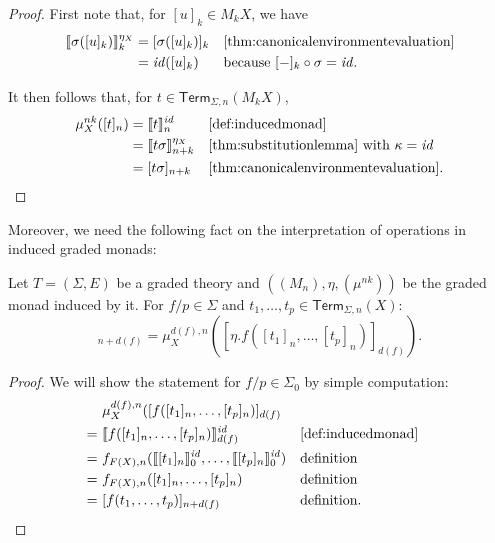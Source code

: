 \documentclass[a4paper,UKenglish,cleveref,thm-restate,numberwithinsect,final]{lipics-v2021}
\newcommand{\Term}{\mathsf{Term}}
\newcommand{\sig}{\Sigma}
\newcommand{\sigp}{\Sigma_0}
\theoremstyle{plain}
\newcommand{\id}{\mathit{id}}
\numberwithin{equation}{section}
\newcommand{\+}[1]{\mathcal{#1}\xspace}
\theoremstyle{definition}
\begin{document}
\begin{proof}
    First note that, for \([u]_k \in M_k X\), we have
    \begin{align*}
        \llbracket \sigma([u]_k) \rrbracket^{\eta_X}_{k}
        &= [\sigma([u]_k)]_k && \text{\cref{thm:canonicalenvironmentevaluation}} \\
        &= \id([u]_k) && \text{because } [-]_k \circ \sigma = \id.
    \end{align*}

    It then follows that, for \(t \in \Term_{\sig, n}(M_k X)\),
    \begin{align*}
        \mu^{nk}_X([t]_n)
        &= \llbracket t \rrbracket^{\id}_n && \text{\cref{def:inducedmonad}} \\
        &= \llbracket t\sigma \rrbracket^{\eta_X}_{n + k} && \text{\cref{thm:substitutionlemma} with } \kappa = \id \\
        &= [t\sigma]_{n + k} && \text{\cref{thm:canonicalenvironmentevaluation}}.
    \end{align*}

\end{proof}

Moreover, we need the following fact on the interpretation of operations in
induced graded monads:

\begin{lemma}\label{thm:multiplicationwithzero}
    Let \(T = (\sig, E)\) be a graded theory and \(((M_n), \eta, (\mu^{nk}))\) be the graded monad induced by it.
    For \(f/p \in \sig\) and \(t_1, \ldots, t_p \in \Term_{\sig, n}(X)\):
    \begin{equation*}
        [\eta.f(t_1, \ldots, t_p)]_{n + d(f)} = \mu^{d(f), n}_X([\eta.f([t_1]_n, \ldots, [t_p]_n)]_{d(f)}).
    \end{equation*}
\end{lemma}

\begin{proof}
    We will show the statement for $f/p\in\sigp$ by simple computation:
    \begin{align*}
        &\mu^{d(f), n}_X([f([t_1]_n, \ldots, [t_p]_n)]_{d(f)} \\
        =~&\llbracket f([t_1]_n, \ldots, [t_p]_n) \rrbracket^\id_{d(f)} && \text{\cref{def:inducedmonad}} \\
        =~&f_{F(X), n}(\llbracket [t_1]_n \rrbracket^\id_0, \ldots, \llbracket [t_p]_n \rrbracket^\id_0) && \text{definition} \\
        =~&f_{F(X), n}([t_1]_n, \ldots, [t_p]_n) && \text{definition} \\
        =~&[f(t_1, \ldots, t_p)]_{n + d(f)} && \text{definition}.
    \end{align*}

\end{proof}
\end{document}
